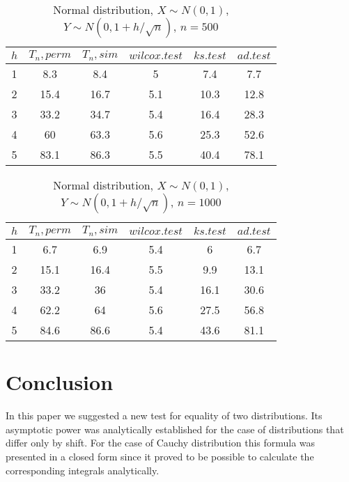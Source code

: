 \documentclass{svproc}
\begin{document}
\begin{table}
  \caption{Normal distribution, $X\sim N(0,1)$, $Y\sim N(0, 1 + h/\sqrt{n})$, $n=500$}
  \begin{center}
  \begin{tabular}{c@{\quad}c@{\quad}c@{\quad}c@{\quad}c@{\quad}c}
  \hline
  $h$ & $T_n, perm$ & $T_n, sim$ & $wilcox.test$ & $ks.test$ & $ad.test$ \\
  \hline
  1 & 8.3 & 8.4 & 5 & 7.4 & 7.7\\
  2 & 15.4 & 16.7 & 5.1 & 10.3 & 12.8 \\
  3 & 33.2 & 34.7 & 5.4 & 16.4 & 28.3 \\
  4 & 60 & 63.3 & 5.6 & 25.3 & 52.6 \\
  5 & 83.1 & 86.3 & 5.5 & 40.4 & 78.1 \\
  \hline
  \end{tabular}
  \end{center}
\end{table}

\begin{table}
  \caption{Normal distribution, $X\sim N(0,1)$, $Y\sim N(0, 1 + h/\sqrt{n})$, $n=1000$}
  \begin{center}
  \begin{tabular}{c@{\quad}c@{\quad}c@{\quad}c@{\quad}c@{\quad}c}
  \hline
  $h$ & $T_n, perm$ & $T_n, sim$ & $wilcox.test$ & $ks.test$ & $ad.test$ \\
  \hline
  1 & 6.7 & 6.9 & 5.4 & 6 & 6.7 \\
  2 & 15.1 & 16.4 & 5.5 & 9.9 & 13.1 \\
  3 & 33.2 & 36 & 5.4 & 16.1 & 30.6 \\
  4 & 62.2 & 64 & 5.6 & 27.5 & 56.8 \\
  5 & 84.6 & 86.6 & 5.4 & 43.6 & 81.1 \\
  \hline
  \end{tabular}
  \end{center}
\end{table}





\section{Conclusion}
In this paper we suggested a new test for equality of two distributions. Its asymptotic power was analytically established for the case of distributions that differ only by shift. For the case of Cauchy distribution this formula was presented in a closed form  since it proved to be possible to calculate the corresponding integrals analytically.
\end{document}
